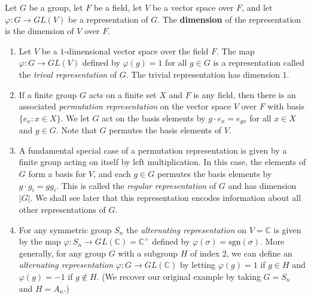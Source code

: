  \begin{defn}Let $G$ be a group, let $F$ be a field, let $V$ be a vector space over $F$, and let $\varphi \colon G \to GL(V)$ be a representation of $G$.  The \textbf{dimension} of the representation is the dimension of $V$ over $F$.  
 \end{defn}
 \begin{example}
 \begin{enumerate}
\item Let $V$ be a $1$-dimensional vector space over the field $F$.  The map $\varphi \colon G \to GL(V)$ defined by $\varphi(g) = 1$ for all $g \in G$ is a representation called the \textit{trival representation} of $G$.  The trivial representation has dimension $1$.

\item If a finite group $G$ acts on a finite set $X$ and $F$ is any field, then there is an associated \textit{permutation representation}  on the vector space $V$ over $F$ with basis $\{e_x \colon x \in X\}$.  We let $G$ act on the basis elements by $g \cdot e_x = e_{gx}$ for all $x \in X$ and $g \in G$. Note that $G$ permutes the basis elements of $V$. 

\item A fundamental special case of a permutation representation is given by a finite group acting on itself by left multiplication.  In this case, the elements of $G$ form a basis for $V$, and each $g \in G$ permutes the basis elements by $g \cdot g_i = gg_i$.  This is called the \textit{regular representation} of $G$ and has dimension $|G|$. We shall see later that this representation encodes information about all other representations of $G$.

\item For any symmetric group $S_n$ the \textit{alternating representation} on $V=\mathbb{C}$ is given by the map $\varphi \colon S_n \to GL(\mathbb{C})=\mathbb{C}^\times$ defined by $\varphi(\sigma)=\text{sgn}(\sigma)$. More generally, for any group $G$ with a subgroup $H$ of index $2$, we can define an \textit{alternating representation} $\varphi \colon G \to GL(\mathbb{C})$ by letting $\varphi(g) = 1$ if $g \in H$ and $\varphi(g) = -1$ if $g \notin H$.  (We recover our original example  by taking $G= S_n$ and $H=A_n$.)

\end{enumerate}
 \end{example}


